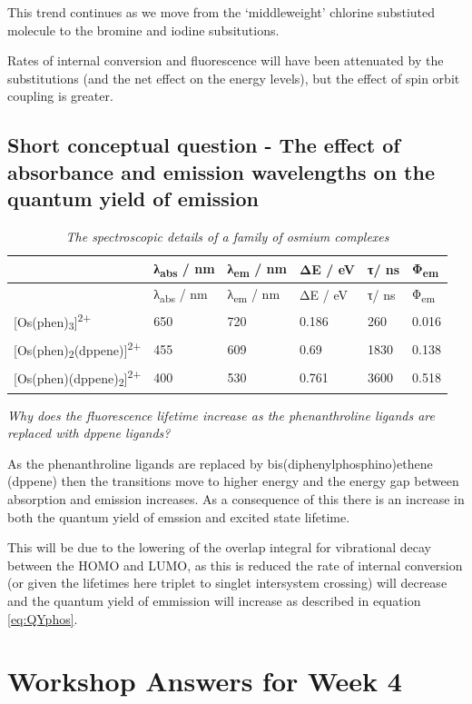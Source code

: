 \documentclass[
]{book}
\begin{document}
This trend continues as we move from the `middleweight' chlorine substiuted molecule to the bromine and iodine subsitutions.

Rates of internal conversion and fluorescence will have been attenuated by the substitutions (and the net effect on the energy levels), but the effect of spin orbit coupling is greater.

\hypertarget{sec:osphen}{%
\section{Short conceptual question - The effect of absorbance and emission wavelengths on the quantum yield of emission}\label{sec:osphen}}

\begin{longtable}[]{@{}llllll@{}}
\caption{\label{tab:osphen} \emph{The spectroscopic details of a family of osmium complexes}}\tabularnewline
\toprule
& λ\textsubscript{abs} / nm & λ\textsubscript{em} / nm & ΔE / eV & τ/ ns & Φ\textsubscript{em}\tabularnewline
\midrule
\endfirsthead
\toprule
& λ\textsubscript{abs} / nm & λ\textsubscript{em} / nm & ΔE / eV & τ/ ns & Φ\textsubscript{em}\tabularnewline
\midrule
\endhead
{[}Os(phen)\textsubscript{3}{]}\textsuperscript{2+} & 650 & 720 & 0.186 & 260 & 0.016\tabularnewline
{[}Os(phen)\textsubscript{2}(dppene){]}\textsuperscript{2+} & 455 & 609 & 0.69 & 1830 & 0.138\tabularnewline
{[}Os(phen)(dppene)\textsubscript{2}{]}\textsuperscript{2+} & 400 & 530 & 0.761 & 3600 & 0.518\tabularnewline
\bottomrule
\end{longtable}

\emph{Why does the fluorescence lifetime increase as the phenanthroline ligands are replaced with dppene ligands?}

As the phenanthroline ligands are replaced by bis(diphenylphosphino)ethene (dppene) then the transitions move to higher energy and the energy gap between absorption and emission increases. As a consequence of this there is an increase in both the quantum yield of emssion and excited state lifetime.

This will be due to the lowering of the overlap integral for vibrational decay between the HOMO and LUMO, as this is reduced the rate of internal conversion (or given the lifetimes here triplet to singlet intersystem crossing) will decrease and the quantum yield of emmission will increase as described in equation \eqref{eq:QYphos}.

\hypertarget{ch:Workshop4}{%
\chapter{Workshop Answers for Week 4}\label{ch:Workshop4}}
\end{document}
